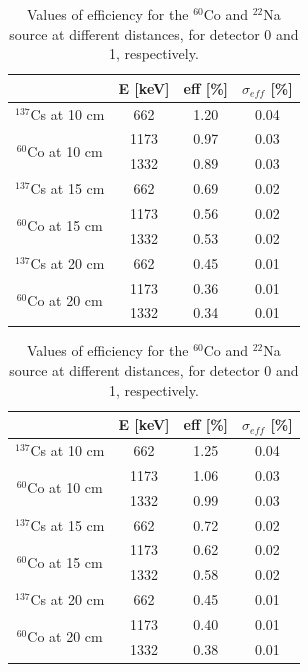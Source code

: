 \begin{table}[h]
    \begin{subtable}
        \centering
        \begin{tabular}{|c|c|c|c|}
        \hline
        & E [keV]  & eff [\%] &$\sigma_{eff}$ [\%]  \\
        \hline
        $^{137}$Cs at 10 cm & 662 &1.20&0.04\\
        \hline
        \multirow{2}{*}{$^{60}$Co at 10 cm}&1173 &0.97 & 0.03 \\ 
        &1332 &0.89 & 0.03 \\
        \hline
        $^{137}$Cs at 15 cm & 662 &0.69&0.02\\
        \hline
        \multirow{2}{*}{$^{60}$Co at 15 cm}&1173 &0.56 & 0.02 \\ 
        &1332 &0.53 & 0.02 \\
        \hline
        $^{137}$Cs at 20 cm & 662 &0.45&0.01\\
        \hline
        \multirow{2}{*}{$^{60}$Co at 20 cm}&1173 &0.36 & 0.01 \\
        &1332 &0.34 & 0.01 \\
        \hline
        \end{tabular}
    \end{subtable}
    \qquad
    \qquad
    \qquad
    \begin{subtable}
        \centering
        \begin{tabular}{|c|c|c|c|}
        \hline
        & E [keV]  & eff [\%] &$\sigma_{eff}$ [\%]  \\
        \hline
        $^{137}$Cs at 10 cm & 662 &1.25&0.04\\
        \hline
        \multirow{2}{*}{$^{60}$Co at 10 cm}&1173 &1.06 & 0.03 \\ 
        &1332 &0.99 & 0.03 \\
        \hline
        $^{137}$Cs at 15 cm & 662 &0.72&0.02\\
        \hline
        \multirow{2}{*}{$^{60}$Co at 15 cm}&1173 &0.62 & 0.02 \\ 
        &1332 &0.58 & 0.02 \\
        \hline
        $^{137}$Cs at 20 cm & 662 &0.45&0.01\\
        \hline
        \multirow{2}{*}{$^{60}$Co at 20 cm}&1173 &0.40 & 0.01 \\
        &1332 &0.38 & 0.01 \\
        \hline
        \end{tabular}
     \end{subtable}
     \caption{Values of efficiency for the $^{60}$Co and $^{22}$Na source at different distances, for detector 0 and 1, respectively.}
     \label{table:eff_rough}
\end{table}



